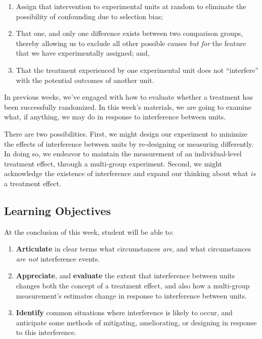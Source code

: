 \documentclass[
]{article}
\providecommand{\tightlist}{%
  \setlength{\itemsep}{0pt}\setlength{\parskip}{0pt}}
\theoremstyle{definition}
\theoremstyle{definition}
\theoremstyle{definition}
\theoremstyle{definition}
\theoremstyle{remark}
\begin{document}
\begin{enumerate}
\def\labelenumi{\arabic{enumi}.}
\tightlist
\item
  Assign that intervention to experimental units at random to eliminate the possibility of confounding due to selection bias;
\item
  That one, and only one difference exists between two comparison groups, thereby allowing us to exclude all other possible causes \emph{but for} the feature that we have experimentally assigned; and,
\item
  That the treatment experienced by one experimental unit does not ``interfere'' with the potential outcomes of another unit.
\end{enumerate}

In previous weeks, we've engaged with how to evaluate whether a treatment has been successfully randomized. In this week's materials, we are going to examine what, if anything, we may do in response to interference between units.

There are two possibilities. First, we might design our experiment to minimize the effects of interference between units by re-designing or measuring differently. In doing so, we endeavor to maintain the measurement of an individual-level treatment effect, through a multi-group experiment. Second, we might acknowledge the existence of interference and expand our thinking about what \emph{is} a treatment effect.

\subsection{Learning Objectives}\label{learning-objectives-9}

At the conclusion of this week, student will be able to:

\begin{enumerate}
\def\labelenumi{\arabic{enumi}.}
\tightlist
\item
  \textbf{Articulate} in clear terms what circumstances \emph{are}, and what circumstances \emph{are not} interference events.
\item
  \textbf{Appreciate}, and \textbf{evaluate} the extent that interference between units changes both the concept of a treatment effect, and also how a multi-group measurement's estimates change in response to interference between units.
\item
  \textbf{Identify} common situations where interference is likely to occur, and anticipate some methods of mitigating, ameliorating, or designing in response to this interference.
\end{enumerate}
\end{document}
